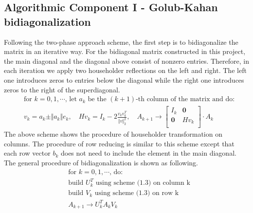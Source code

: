 \subsection{Algorithmic Component I - Golub-Kahan bidiagonalization}
Following the two-phase approach scheme, the first step is to bidiagonalize the matrix in an iterative way. For the bidiagonal matrix constructed in this project, the main diagonal and the diagonal above consist of nonzero entries. Therefore, in each iteration we apply two householder reflections on the left and right. The left one introduces zeros to entries below the diagonal while the right one introduces zeros to the right of the superdiagonal. 
\begin{equation}\tag{2.3}
\begin{aligned}
    & \text{for $k = 0, 1, \cdots$, let $a_k$ be the $(k+1)$-th column of the matrix and do:} \\
    & v_k = a_k \pm \Vert a_k \Vert e_k, \quad Hv_k = I_k - 2 \frac{v_kv_k^T}{\Vert v \Vert_2^2}, \quad A_{k + 1} \rightarrow \left[\begin{matrix}I_k & \mathbf{0} \\ \mathbf{0} & Hv_k \\ \end{matrix}\right] \cdot A_k
\end{aligned}
\end{equation}
The above scheme shows the procedure of householder transformation on columns. The procedure of row reducing is similar to this scheme except that each row vector $b_k$ does not need to include the element in the main diagonal. The general procedure of bidiagonalization is shown as following.
\begin{equation}\tag{2.4}
\begin{aligned}
& \text{for $k = 0, 1, \cdots$, do:}\\
& \text{build $U_k^T$ using scheme (1.3) on column k} \\ 
& \text{build $V_k$ using scheme (1.3) on row k} \\
& A_{k + 1} \rightarrow U_k^TA_kV_k \\
\end{aligned}
\end{equation}
